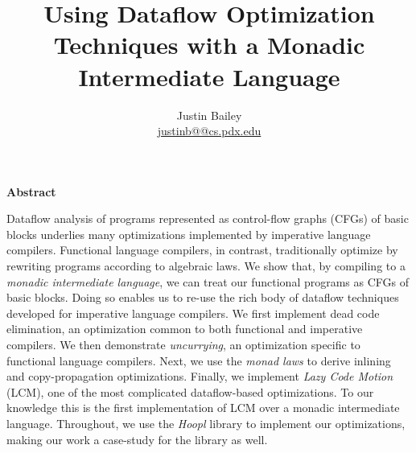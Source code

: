 \documentclass[12pt]{article}
\begin{document}


\newcommand{\authorEmail}{\url{justinb@@cs.pdx.edu}}

\date{}
\author{Justin Bailey \\ \authorEmail}
\title{Using Dataflow Optimization Techniques with a Monadic Intermediate Language}
\maketitle 
\thispagestyle{empty}
\newpage
{}
\thispagestyle{plain}


\begin{center}
  \newlength{\abstractLen}
  \begin{minipage}{\abstractLen}
    \begin{center}
      {\sffamily\bfseries Abstract}
    \end{center}
    \bigskip
    \noindent
    Dataflow analysis of programs represented as control-flow graphs
    (CFGs) of basic blocks underlies many optimizations implemented by
    imperative language compilers. Functional language compilers, in
    contrast, traditionally optimize by rewriting programs according to
    algebraic laws. We show that, by compiling to a \emph{monadic
      intermediate language}, we can treat our functional programs as
    CFGs of basic blocks. Doing so enables us to re-use the rich body of
    dataflow techniques developed for imperative language compilers. We
    first implement dead code elimination, an optimization common to
    both functional and imperative compilers. We then demonstrate
    \emph{uncurrying}, an optimization specific to functional language
    compilers. Next, we use the \emph{monad laws} to derive inlining and
    copy-propagation optimizations. Finally, we implement \emph{Lazy
      Code Motion} (LCM), one of the most complicated dataflow-based
    optimizations. To our knowledge this is the first implementation of
    LCM over a monadic intermediate language. Throughout, we use the
    \emph{Hoopl} library to implement our optimizations, making our work
    a case-study for the library as well.
  \end{minipage}
\end{center}

\end{document}
